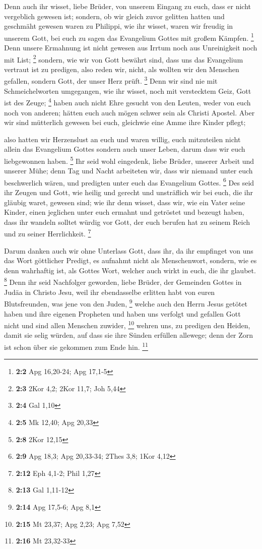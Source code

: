  Denn auch ihr wisset, liebe Brüder, von unserem Eingang
zu euch, dass er nicht vergeblich gewesen ist;  sondern,
ob wir gleich zuvor gelitten hatten und geschmäht gewesen waren zu
Philippi, wie ihr wisset, waren wir freudig in unserem Gott, bei euch zu
sagen das Evangelium Gottes mit großem Kämpfen. \footnote{\textbf{2:2}
  Apg 16,20-24; Apg 17,1-5}  Denn unsere Ermahnung ist
nicht gewesen aus Irrtum noch aus Unreinigkeit noch mit List;
\footnote{\textbf{2:3} 2Kor 4,2; 2Kor 11,7; Joh 5,44} 
sondern, wie wir von Gott bewährt sind, dass uns das Evangelium vertraut
ist zu predigen, also reden wir, nicht, als wollten wir den Menschen
gefallen, sondern Gott, der unser Herz prüft. \footnote{\textbf{2:4} Gal
  1,10}  Denn wir sind nie mit Schmeichelworten
umgegangen, wie ihr wisset, noch mit verstecktem Geiz, Gott ist des
Zeuge; \footnote{\textbf{2:5} Mk 12,40; Apg 20,33}  haben
auch nicht Ehre gesucht von den Leuten, weder von euch noch von anderen;
 hätten euch auch mögen schwer sein als Christi Apostel.
Aber wir sind mütterlich gewesen bei euch, gleichwie eine Amme ihre
Kinder pflegt;

 also hatten wir Herzenslust an euch und waren willig,
euch mitzuteilen nicht allein das Evangelium Gottes sondern auch unser
Leben, darum dass wir euch liebgewonnen haben. \footnote{\textbf{2:8}
  2Kor 12,15}  Ihr seid wohl eingedenk, liebe Brüder,
unserer Arbeit und unserer Mühe; denn Tag und Nacht arbeiteten wir, dass
wir niemand unter euch beschwerlich wären, und predigten unter euch das
Evangelium Gottes. \footnote{\textbf{2:9} Apg 18,3; Apg 20,33-34; 2Thes
  3,8; 1Kor 4,12}  Des seid ihr Zeugen und Gott, wie
heilig und gerecht und unsträflich wir bei euch, die ihr gläubig waret,
gewesen sind;  wie ihr denn wisset, dass wir, wie ein
Vater seine Kinder, einen jeglichen unter euch ermahnt und getröstet
 und bezeugt haben, dass ihr wandeln solltet würdig vor
Gott, der euch berufen hat zu seinem Reich und zu seiner Herrlichkeit.
\footnote{\textbf{2:12} Eph 4,1-2; Phil 1,27}

 Darum danken auch wir ohne Unterlass Gott, dass ihr, da
ihr empfinget von uns das Wort göttlicher Predigt, es aufnahmt nicht als
Menschenwort, sondern, wie es denn wahrhaftig ist, als Gottes Wort,
welcher auch wirkt in euch, die ihr glaubet. \footnote{\textbf{2:13} Gal
  1,11-12}  Denn ihr seid Nachfolger geworden, liebe
Brüder, der Gemeinden Gottes in Judäa in Christo Jesu, weil ihr
ebendasselbe erlitten habt von euren Blutsfreunden, was jene von den
Juden, \footnote{\textbf{2:14} Apg 17,5-6; Apg 8,1} 
welche auch den Herrn Jesus getötet haben und ihre eigenen Propheten und
haben uns verfolgt und gefallen Gott nicht und sind allen Menschen
zuwider, \footnote{\textbf{2:15} Mt 23,37; Apg 2,23; Apg 7,52}
 wehren uns, zu predigen den Heiden, damit sie selig
würden, auf dass sie ihre Sünden erfüllen allewege; denn der Zorn ist
schon über sie gekommen zum Ende hin. \footnote{\textbf{2:16} Mt
  23,32-33}

